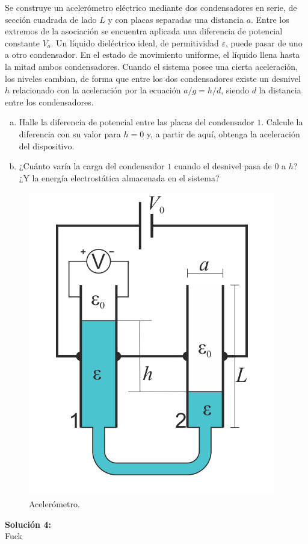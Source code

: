 \begin{mdframed}[style=warning]
	\begin{ejercicio}
		Se construye un acelerómetro eléctrico mediante dos condensadores en serie, de sección cuadrada de lado $L$ y con placas separadas una distancia $a$. Entre los extremos de la asociación se encuentra aplicada una diferencia de potencial constante $V_o$. Un líquido dieléctrico ideal, de permitividad $\varepsilon$, puede pasar de uno a otro condensador. En el estado de movimiento uniforme, el líquido llena hasta la mitad ambos condensadores. Cuando el sistema posee una cierta aceleración, los niveles cambian, de forma que entre los dos condensadores existe un desnivel $h$ relacionado con la aceleración por la ecuación $a/g = h/d$, siendo $d$ la distancia entre los condensadores.
		\begin{enumerate}[a)]
			\item Halle la diferencia de potencial entre las placas del condensador $1$. Calcule la diferencia con su valor para $h = 0$ y, a partir de aquí, obtenga la aceleración del dispositivo.
			\item ¿Cuánto varía la carga del condensador $1$ cuando el desnivel pasa de $0$ a $h$? ¿Y la energía electrostática almacenada en el sistema?
		\end{enumerate}
		\begin{figure}[H]
			\centering
			\includegraphics[scale=0.25]{./img/acelerometro.png}
			\caption{Acelerómetro.}
			\label{ej3}
		\end{figure}
	\end{ejercicio}
	\textbf{Solución 4: } \\
	Fuck
\end{mdframed}
